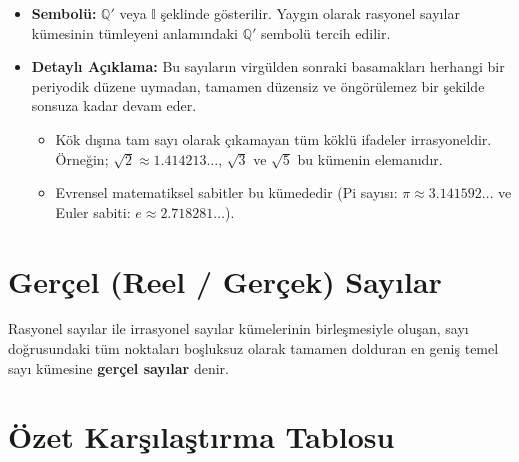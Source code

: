 \documentclass{article}
\begin{document}
\begin{itemize}
    \item \textbf{Sembolü:} $\mathbb{Q}'$ veya $\mathbb{I}$ şeklinde gösterilir. Yaygın olarak rasyonel sayılar kümesinin tümleyeni anlamındaki $\mathbb{Q}'$ sembolü tercih edilir.
    \item \textbf{Detaylı Açıklama:} Bu sayıların virgülden sonraki basamakları herhangi bir periyodik düzene uymadan, tamamen düzensiz ve öngörülemez bir şekilde sonsuza kadar devam eder.
    \begin{itemize}
        \item Kök dışına tam sayı olarak çıkamayan tüm köklü ifadeler irrasyoneldir. Örneğin; $\sqrt{2} \approx 1.414213\dots$, $\sqrt{3}$ ve $\sqrt{5}$ bu kümenin elemanıdır.
        \item Evrensel matematiksel sabitler bu kümededir (Pi sayısı: $\pi \approx 3.141592\dots$ ve Euler sabiti: $e \approx 2.718281\dots$).
    \end{itemize}
\end{itemize}

\section{Gerçel (Reel / Gerçek) Sayılar}
Rasyonel sayılar ile irrasyonel sayılar kümelerinin birleşmesiyle oluşan, sayı doğrusundaki tüm noktaları boşluksuz olarak tamamen dolduran en geniş temel sayı kümesine \textbf{gerçel sayılar} denir.


\newpage
\section{Özet Karşılaştırma Tablosu}
\end{document}
